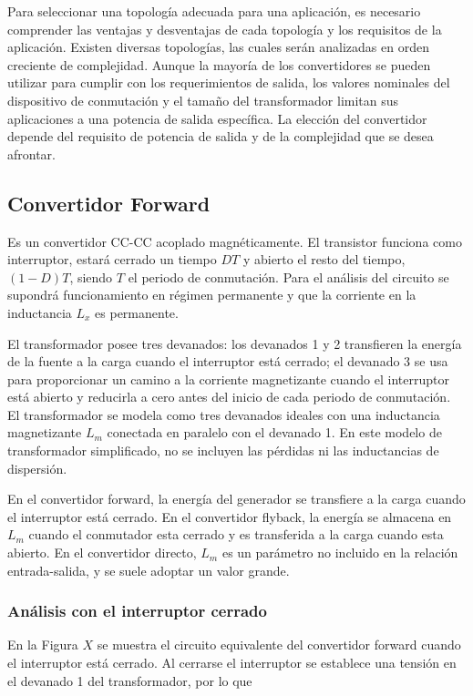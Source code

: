 Para seleccionar una topología adecuada para una aplicación, es necesario comprender las ventajas y desventajas de cada topología y los requisitos de la aplicación. 
Existen diversas topologías, las cuales serán analizadas en orden creciente de complejidad. 
Aunque la mayoría de los convertidores se pueden utilizar para cumplir con los requerimientos de salida, 
los valores nominales del dispositivo de conmutación y el tamaño del transformador limitan sus aplicaciones a una potencia de salida específica. 
La elección del convertidor depende del requisito de potencia de salida y de la complejidad que se desea afrontar.

\subsection{Convertidor Forward}

Es un convertidor CC-CC acoplado magnéticamente. El transistor funciona como interruptor, estará cerrado un tiempo $DT$ y abierto el resto del tiempo,
$(1 - D)T$, siendo $T$ el periodo de conmutación. 
Para el análisis del circuito se supondrá funcionamiento 
en régimen permanente y que la corriente en la inductancia $L_x$ es permanente.

El transformador posee tres devanados: los devanados 1 y 2 transfieren la energía de la
fuente a la carga cuando el interruptor está cerrado; el devanado 3 se usa para proporcionar un
camino a la corriente magnetizante cuando el interruptor está abierto y reducirla a cero antes del
inicio de cada periodo de conmutación. El transformador se modela como tres devanados ideales
con una inductancia magnetizante $L_m$ conectada en paralelo con el devanado 1. En este modelo
de transformador simplificado, no se incluyen las pérdidas ni las inductancias de dispersión.

En el convertidor forward, la energía del generador se transfiere a la carga cuando el interruptor
está cerrado. En el convertidor flyback, la energía se almacena en $L_m$ cuando el conmutador
esta cerrado y es transferida a la carga cuando esta abierto. En el convertidor directo, $L_m$
es un parámetro no incluido en la relación entrada-salida, y se suele adoptar un valor grande.

\subsubsection{Análisis con el interruptor cerrado}
En la Figura $X$ se muestra el circuito equivalente del convertidor forward cuando el interruptor
está cerrado. Al cerrarse el interruptor se establece una tensión en el devanado 1 del transformador, por lo que

